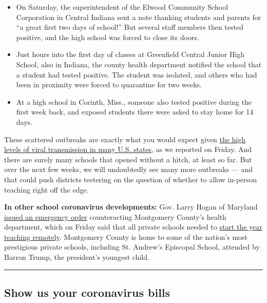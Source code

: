 \begin{itemize}
\item
  On Saturday, the superintendent of the Elwood Community School
  Corporation in Central Indiana sent a note thanking students and
  parents for ``a great first two days of school!'' But several staff
  members then tested positive, and the high school was forced to close
  its doors.
\item
  Just hours into the first day of classes at Greenfield Central Junior
  High School, also in Indiana, the county health department notified
  the school that a student had tested positive. The student was
  isolated, and others who had been in proximity were forced to
  quarantine for two weeks.
\item
  At a high school in Corinth, Miss., someone also tested positive
  during the first week back, and exposed students there were asked to
  stay home for 14 days.
\end{itemize}

These scattered outbreaks are exactly what you would expect given
\href{https://www.nytimes3xbfgragh.onion/interactive/2020/07/31/us/coronavirus-school-reopening-risk.html}{the
high levels of viral transmission in many U.S. states}, as we reported
on Friday. And there are surely many schools that opened without a
hitch, at least so far. But over the next few weeks, we will undoubtedly
see many more outbreaks --- and that could push districts teetering on
the question of whether to allow in-person teaching right off the edge.

\textbf{In other school coronavirus developments:} Gov. Larry Hogan of
Maryland
\href{https://twitter.com/GovLarryHogan/status/1290330304830246912}{issued
an emergency order} counteracting Montgomery County's health department,
which on Friday said that all private schools needed to
\href{https://www.washingtonpost.com/local/education/montgomery-county-health-officials-tell-private-schools-to-start-school-online/2020/08/01/64552b9e-d3fd-11ea-9038-af089b63ac21_story.html}{start
the year teaching remotely}. Montgomery County is home to some of the
nation's most prestigious private schools, including St. Andrew's
Episcopal School, attended by Barron Trump, the president's youngest
child.

\begin{center}\rule{0.5\linewidth}{\linethickness}\end{center}

\hypertarget{show-us-your-coronavirus-bills}{%
\subsection{Show us your coronavirus
bills}\label{show-us-your-coronavirus-bills}}

